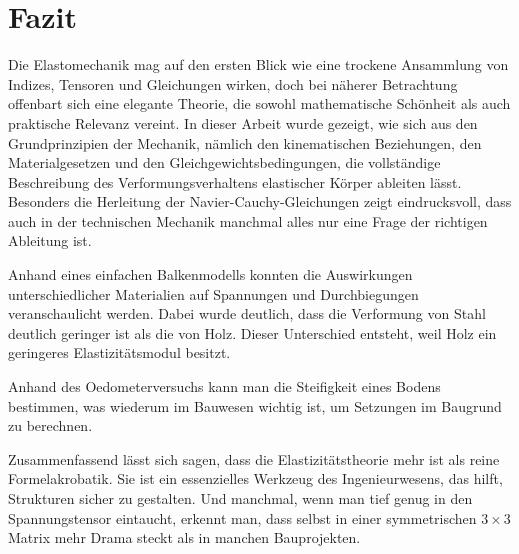 %
%
%
%
\section{Fazit
\label{elastomechanik:section:teil5}}
Die Elastomechanik mag auf den ersten Blick wie eine trockene
Ansammlung von Indizes, Tensoren und Gleichungen wirken, doch bei
näherer Betrachtung offenbart sich eine elegante Theorie, die sowohl
mathematische Schönheit als auch praktische Relevanz vereint.
In dieser Arbeit wurde gezeigt, wie sich aus den Grundprinzipien
der Mechanik, nämlich den kinematischen Beziehungen, den Materialgesetzen
und den Gleichgewichtsbedingungen, die vollständige Beschreibung
des Verformungsverhaltens elastischer Körper ableiten lässt.
Besonders die Herleitung der Navier-Cauchy-Gleichungen zeigt
eindrucksvoll, dass auch in der technischen Mechanik manchmal alles
nur eine Frage der richtigen Ableitung ist.

Anhand eines einfachen Balkenmodells konnten die Auswirkungen
unterschiedlicher Materialien auf Spannungen und Durchbiegungen
veranschaulicht werden.
Dabei wurde deutlich, dass die Verformung von Stahl deutlich geringer
ist als die von Holz.
Dieser Unterschied entsteht, weil Holz ein geringeres Elastizitätsmodul
besitzt.

Anhand des Oedometerversuchs kann man die Steifigkeit eines Bodens
bestimmen, was wiederum im Bauwesen wichtig ist, um Setzungen im
Baugrund zu berechnen.

Zusammenfassend lässt sich sagen, dass die Elastizitätstheorie mehr
ist als reine Formelakrobatik.
Sie ist ein essenzielles Werkzeug des Ingenieurwesens, das hilft,
Strukturen sicher zu gestalten.
Und manchmal, wenn man tief genug in den Spannungstensor eintaucht,
erkennt man, dass selbst in einer symmetrischen $3 \times 3$ Matrix
mehr Drama steckt als in manchen Bauprojekten.


